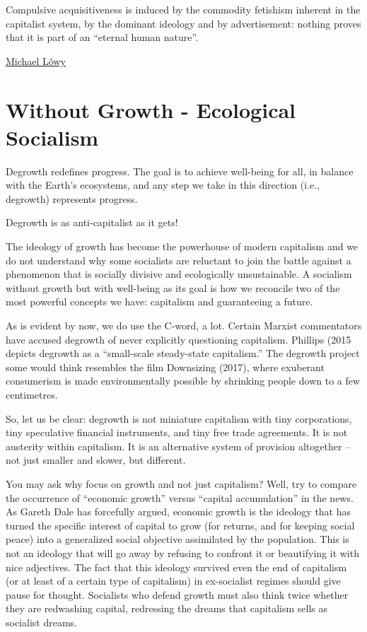 \documentclass[
]{book}
\begin{document}
Compulsive acquisitiveness is induced by the commodity fetishism inherent in the capitalist system, by the dominant ideology and by advertisement: nothing proves that it is part of an ``eternal human nature''.

\href{https://www.letusrise.ie/rupture-articles/2wl71srdonxrbgxal9v6bv78njr2fb}{Michael Lõwy}

\hypertarget{without-growth---ecological-socialism}{%
\section{Without Growth - Ecological Socialism}\label{without-growth---ecological-socialism}}

Degrowth redefines progress.
The goal is to achieve well-being for all,
in balance with the Earth's ecosystems,
and any step we take in this direction (i.e., degrowth) represents progress.

Degrowth is as anti-capitalist as it gets!

The ideology of growth has become the powerhouse of modern capitalism and we do not understand why some socialists are reluctant to join the battle against a phenomenon that is socially divisive and ecologically unsustainable. A socialism without growth but with well-being as its goal is how we reconcile two of the most powerful concepts we have: capitalism and guaranteeing a future.

As is evident by now, we do use the C-word, a lot. Certain Marxist commentators have accused degrowth of never explicitly questioning capitalism. Phillips (2015 depicts degrowth as a ``small-scale steady-state capitalism.'' The degrowth project some would think resembles the film Downsizing (2017), where exuberant consumerism is made environmentally possible by shrinking people down to a few centimetres.

So, let us be clear: degrowth is not miniature capitalism with tiny corporations, tiny speculative financial instruments, and tiny free trade agreements. It is not austerity within capitalism. It is an alternative system of provision altogether -- not just smaller and slower, but different.

You may ask why focus on growth and not just capitalism? Well, try to compare the occurrence of ``economic growth'' versus ``capital accumulation'' in the news. As Gareth Dale has forcefully argued, economic growth is the ideology that has turned the specific interest of capital to grow (for returns, and for keeping social peace) into a generalized social objective assimilated by the population. This is not an ideology that will go away by refusing to confront it or beautifying it with nice adjectives. The fact that this ideology survived even the end of capitalism (or at least of a certain type of capitalism) in ex-socialist regimes should give pause for thought. Socialists who defend growth must also think twice whether they are redwashing capital, redressing the dreams that capitalism sells as socialist dreams.
\end{document}

